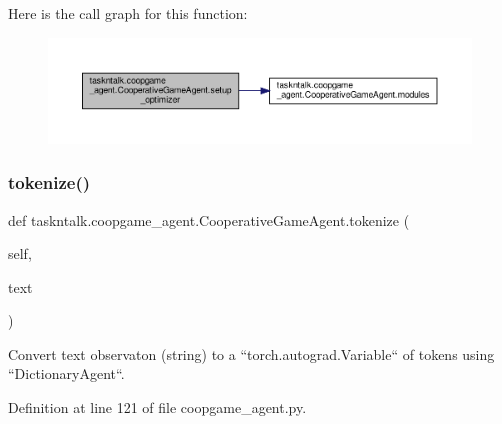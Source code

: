 Here is the call graph for this function\+:
\nopagebreak
\begin{figure}[H]
\begin{center}
\leavevmode
\includegraphics[width=350pt]{classtaskntalk_1_1coopgame__agent_1_1CooperativeGameAgent_ad4a768b95069e59032643450d45e6cb6_cgraph}
\end{center}
\end{figure}
\mbox{\label{classtaskntalk_1_1coopgame__agent_1_1CooperativeGameAgent_a78fcf261c9be67a548a59946d3f48757}} 
\subsubsection{\texorpdfstring{tokenize()}{tokenize()}}
{\footnotesize\ttfamily def taskntalk.\+coopgame\+\_\+agent.\+Cooperative\+Game\+Agent.\+tokenize (\begin{DoxyParamCaption}\item[{}]{self,  }\item[{}]{text }\end{DoxyParamCaption})}

\begin{DoxyVerb}Convert text observaton (string) to a ``torch.autograd.Variable`` of
tokens using ``DictionaryAgent``.
\end{DoxyVerb}
 

Definition at line 121 of file coopgame\+\_\+agent.\+py.



